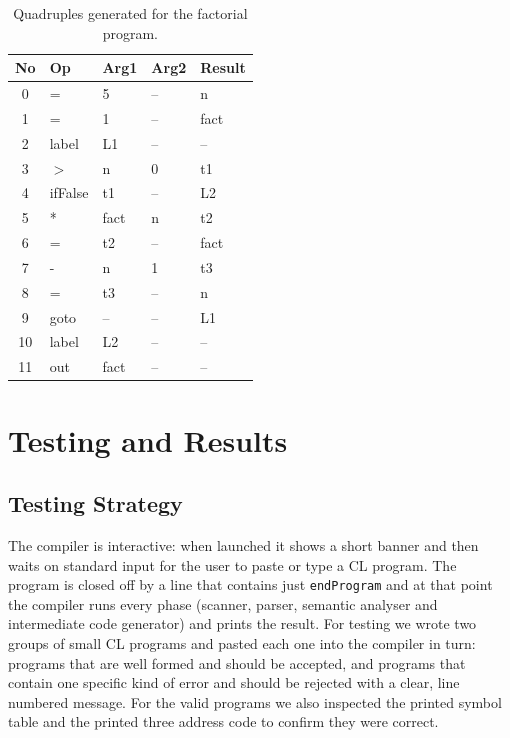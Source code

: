 \documentclass[12pt,a4paper]{report}
\begin{document}
\begin{table}[H]
\centering
\begin{tabular}{|c|l|l|l|l|}
\hline
\textbf{No} & \textbf{Op} & \textbf{Arg1} & \textbf{Arg2} & \textbf{Result} \\
\hline
0  & =       & 5     & --   & n     \\
1  & =       & 1     & --   & fact  \\
2  & label   & L1    & --   & --    \\
3  & $>$     & n     & 0    & t1    \\
4  & ifFalse & t1    & --   & L2    \\
5  & *       & fact  & n    & t2    \\
6  & =       & t2    & --   & fact  \\
7  & -       & n     & 1    & t3    \\
8  & =       & t3    & --   & n     \\
9  & goto    & --    & --   & L1    \\
10 & label   & L2    & --   & --    \\
11 & out     & fact  & --   & --    \\
\hline
\end{tabular}
\caption{Quadruples generated for the factorial program.}
\label{tab:quadloop}
\end{table}

\chapter{Testing and Results}

\section{Testing Strategy}

The compiler is interactive: when launched it shows a short banner and then waits on standard input for the user to paste or type a CL program. The program is closed off by a line that contains just \texttt{endProgram} and at that point the compiler runs every phase (scanner, parser, semantic analyser and intermediate code generator) and prints the result. For testing we wrote two groups of small CL programs and pasted each one into the compiler in turn: programs that are well formed and should be accepted, and programs that contain one specific kind of error and should be rejected with a clear, line numbered message. For the valid programs we also inspected the printed symbol table and the printed three address code to confirm they were correct.
\end{document}
